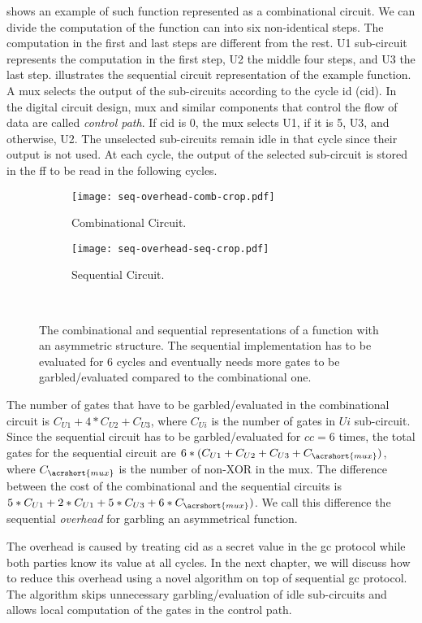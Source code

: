  shows an example of such function represented as a combinational circuit.
We can divide the computation of the function can into six non-identical steps.
The computation in the first and last steps are different from the rest.
U1 sub-circuit represents the computation in the first step, U2 the middle four steps, and U3 the last step.
 illustrates the sequential circuit representation of the example function.
A \acrshort{mux} selects the output of the sub-circuits according to the cycle id (cid).
In the digital circuit design, \acrshort{mux} and similar components that control the flow of data are called \textit{control path}.
If cid is 0, the \acrshort{mux} selects U1, if it is 5, U3, and otherwise, U2.
The unselected sub-circuits remain idle in that cycle since their output is not used.
At each cycle, the output of the selected sub-circuit is stored in the \acrshort{ff} to be read in the following cycles.

\begin{figure}
    \centering
    \begin{subfigure}[t]{0.7\textwidth}
        \texttt{[image: seq-overhead-comb-crop.pdf]}
        \caption{Combinational Circuit.}\label{fig:seq-overhead-comb}
    \end{subfigure}
    \begin{subfigure}[t]{0.6\textwidth}
        \texttt{[image: seq-overhead-seq-crop.pdf]}
        \caption{Sequential Circuit.}\label{fig:seq-overhead-seq}
    \end{subfigure}\\
    \caption{The combinational and sequential representations of a function with an asymmetric structure.
    The sequential implementation has to be evaluated for 6 cycles and eventually needs more gates to be garbled/evaluated compared to the combinational one.}\label{fig:fig:seq-overhead-comb}
\end{figure}

The number of gates that have to be garbled/evaluated in the combinational circuit is $C_{U1}+4*C_{U2}+C_{U3}$, where $C_{Ui}$ is the number of gates in $Ui$ sub-circuit.
Since the sequential circuit has to be garbled/evaluated for $cc=6$ times, the total gates for the sequential circuit are $6*(C_{U1}+C_{U2}+C_{U3}+C_{\acrshort{mux}})$, where $C_{\acrshort{mux}}$ is the number of non-XOR in the \acrshort{mux}.
The difference between the cost of the combinational and the sequential circuits is $5*C_{U1}+2*C_{U1}+5*C_{U3}+6*C_{\acrshort{mux}})$.
We call this difference the sequential \textit{overhead} for garbling an asymmetrical function.

The overhead is caused by treating cid as a secret value in the \acrshort{gc} protocol while both parties know its value at all cycles.
In the next chapter, we will discuss how to reduce this overhead using a novel algorithm on top of sequential \acrshort{gc} protocol.
The algorithm skips unnecessary garbling/evaluation of idle sub-circuits and allows local computation of the gates in the control path.
